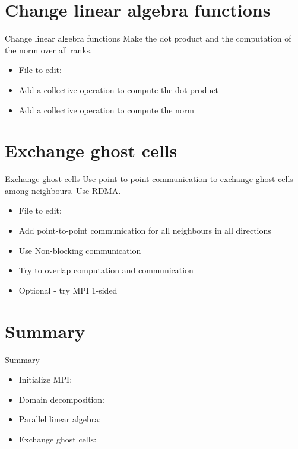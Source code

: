 \documentclass[aspectratio=43]{beamer}
\begin{document}
\section{Change linear algebra functions}
\begin{frame}[fragile]{Change linear algebra functions}
Make the dot product and the computation of the norm over all ranks.
\begin{itemize}
\item File to edit: 
\item Add a collective operation to compute the dot product
\item Add a collective operation to compute the norm
\end{itemize}
\end{frame}

\section{Exchange ghost cells}
\begin{frame}[fragile]{Exchange ghost cells}
Use point to point communication to exchange ghost cells among neighbours.
Use RDMA.
\begin{itemize}
\item File to edit: 
\item Add point-to-point communication for all neighbours in all directions
\item Use Non-blocking communication
\item Try to overlap computation and communication
\item Optional - try MPI 1-sided
\end{itemize}
\end{frame}

\section{Summary}
\begin{frame}[fragile]{Summary}
\begin{itemize}
\item Initialize MPI:\@ {}
\item Domain decomposition: 
\item Parallel linear algebra: 
\item Exchange ghost cells: 
\end{itemize}
\end{frame}

\end{document}
